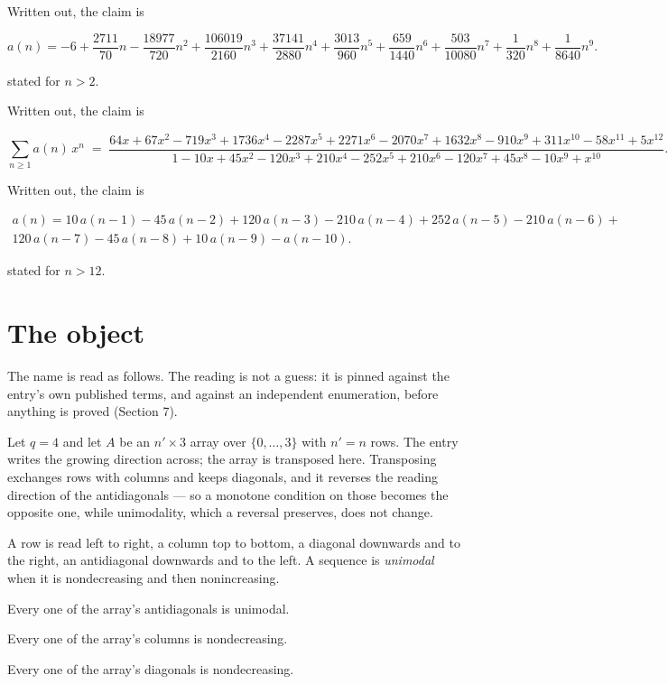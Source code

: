 \documentclass[11pt]{article}
\theoremstyle{definition}
\begin{document}
Written out, the claim is

\[a(n) = -6 + \frac{2711}{70}n - \frac{18977}{720}n^{2} + \frac{106019}{2160}n^{3} + \frac{37141}{2880}n^{4} + \frac{3013}{960}n^{5} + \frac{659}{1440}n^{6} + \frac{503}{10080}n^{7} + \frac{1}{320}n^{8} + \frac{1}{8640}n^{9}.\]

stated for $n > 2$.

Written out, the claim is

\[\sum_{n \ge 1} a(n)\,x^n \;=\; \frac{64x + 67x^{2} - 719x^{3} + 1736x^{4} - 2287x^{5} + 2271x^{6} - 2070x^{7} + 1632x^{8} - 910x^{9} + 311x^{10} - 58x^{11} + 5x^{12}}{1 - 10x + 45x^{2} - 120x^{3} + 210x^{4} - 252x^{5} + 210x^{6} - 120x^{7} + 45x^{8} - 10x^{9} + x^{10}}.\]

Written out, the claim is

\begin{multline*} a(n) = 10\,a(n-1) - 45\,a(n-2) + 120\,a(n-3) - 210\,a(n-4) + 252\,a(n-5) - 210\,a(n-6) + \\ 120\,a(n-7) - 45\,a(n-8) + 10\,a(n-9) - a(n-10). \end{multline*}

stated for $n > 12$.

\section{The object}

The name is read as follows. The reading is not a guess: it is pinned against the entry's own published terms, and against an independent enumeration, before anything is proved (Section 7).

Let $q = 4$ and let $A$ be an $n' \times 3$ array over $\{0,\dots,3\}$ with $n' = n$ rows. The entry writes the growing direction across; the array is transposed here. Transposing exchanges rows with columns and keeps diagonals, and it reverses the reading direction of the antidiagonals --- so a monotone condition on those becomes the opposite one, while unimodality, which a reversal preserves, does not change.

A row is read left to right, a column top to bottom, a diagonal downwards and to the right, an antidiagonal downwards and to the left. A sequence is {\itshape unimodal} when it is nondecreasing and then nonincreasing.

Every one of the array's antidiagonals is unimodal.

Every one of the array's columns is nondecreasing.

Every one of the array's diagonals is nondecreasing.
\end{document}
